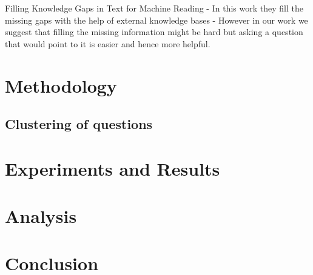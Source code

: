 \documentclass[11pt]{article}
\begin{document}
Filling Knowledge Gaps in Text for Machine Reading
- In this work they fill the missing gaps with the help of external knowledge bases
- However in our work we suggest that filling the missing information might be hard but asking a question that would point to it is easier and hence more helpful.

\section{Methodology}

\subsection{Clustering of questions}

\subsection{}

\section{Experiments and Results}\label{experiments_results}

\section{Analysis}

\section{Conclusion}



\end{document}
